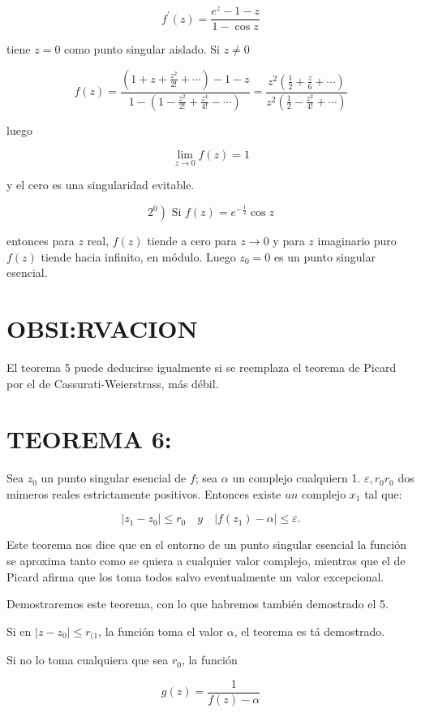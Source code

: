 \documentclass[10pt]{article}
\theoremstyle{plain}
\theoremstyle{definition}
\theoremstyle{remark}
\begin{document}
$$
f^{\prime}(z)=\frac{e^{z}-1-z}{1-\cos z}
$$

tiene $z=0$ como punto singular aislado. Si $z \neq 0$

$$
f(z)=\frac{\left(1+z+\frac{z^{2}}{2!}+\cdots\right)-1-z}{1-\left(1-\frac{z^{2}}{2!}+\frac{z^{4}}{4!}-\cdots\right)}=\frac{z^{2}\left(\frac{1}{2}+\frac{z}{6}+\cdots\right)}{z^{2}\left(\frac{1}{2}-\frac{z^{2}}{4!}+\cdots\right)}
$$

luego

$$
\lim _{z \rightarrow 0} f(z)=1
$$

y el cero es una singularidad evitable.

$$
\left.2^{0}\right) \text { Si } f(z)=e^{-\frac{1}{2}} \cos z
$$

entonces para $z$ real, $f(z)$ tiende a cero para $z \rightarrow 0$ y para $z$ imaginario puro $f(z)$ tiende hacia infinito, en módulo. Luego $z_{0}=0$ es un punto singular esencial.

\section*{OBSI:RVACION}
El teorema 5 puede deducirse igualmente si se reemplaza el teorema de Picard por el de Cassurati-Weierstrass, más débil.

\section*{TEOREMA 6:}
Sea $z_{0}$ un punto singular esencial de $f$; sea $\alpha$ un complejo cualquiern 1. $\varepsilon, r_{0} r_{0}$ dos mimeros reales estrictamente positivos. Entonces existe $u n$ complejo $x_{1}$ tal que:

$$
\left|z_{1}-z_{0}\right| \leqslant r_{0} \quad y \quad\left|f\left(z_{1}\right)-\alpha\right| \leqslant \varepsilon .
$$

Este teorema nos dice que en el entorno de un punto singular esencial la función se aproxima tanto como se quiera a cualquier valor complejo, mientras que el de Picard afirma que los toma todos salvo eventualmente un valor excepcional.

Demostraremos este teorema, con lo que habremos también demostrado el 5.

Si en $\left|z-z_{0}\right| \leqslant r_{(1}$, la función toma el valor $\alpha$, el teorema es tá demostrado.

Si no lo toma cualquiera que sea $r_{0}$, la función

$$
g(z)=\frac{1}{f(z)-\alpha}
$$
\end{document}
